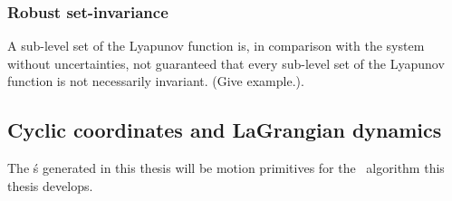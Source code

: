 \subsubsection{Robust set-invariance}

A sub-level set of the Lyapunov function is, in comparison with the system
without uncertainties, not guaranteed that every sub-level set of the Lyapunov
function is not necessarily invariant. (Give example.).

\subsection{Cyclic coordinates and LaGrangian dynamics}

The \funnel\'s generated in this thesis will be motion primitives for the
\rrtfunnel\ algorithm this thesis develops.
